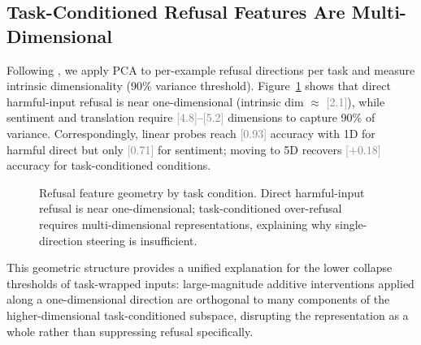 \documentclass[11pt]{article}
\newcommand{\ph}[1]{\textcolor{gray}{[#1]}}
\begin{document}
\subsection{Task-Conditioned Refusal Features Are Multi-Dimensional}

Following \citet{engels2025nonlinear}, we apply PCA to per-example refusal directions per task and measure intrinsic dimensionality (90\% variance threshold). Figure~\ref{fig:geometry} shows that direct harmful-input refusal is near one-dimensional (intrinsic dim $\approx$ \ph{2.1}), while sentiment and translation require \ph{4.8}--\ph{5.2} dimensions to capture 90\% of variance. Correspondingly, linear probes reach \ph{0.93} accuracy with 1D for harmful direct but only \ph{0.71} for sentiment; moving to 5D recovers \ph{$+0.18$} accuracy for task-conditioned conditions.

\begin{figure}[t]
  \centering
  \caption{Refusal feature geometry by task condition. Direct harmful-input refusal is near one-dimensional; task-conditioned over-refusal requires multi-dimensional representations, explaining why single-direction steering is insufficient.}
  \label{fig:geometry}
\end{figure}

This geometric structure provides a unified explanation for the lower collapse thresholds of task-wrapped inputs: large-magnitude additive interventions applied along a one-dimensional direction are orthogonal to many components of the higher-dimensional task-conditioned subspace, disrupting the representation as a whole rather than suppressing refusal specifically.
\end{document}
